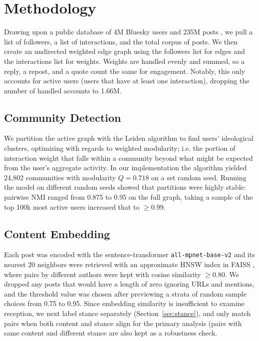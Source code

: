 \documentclass[11pt]{article}   %
\begin{document}
\section{Methodology}\label{sec:methodology}
Drawing upon a public database of 4M Bluesky users and 235M posts \parencite{FaillaRossetti2024, FaillaRossetti2025}, we pull a list of followers, a list of interactions, and the total corpus of posts. We then
create an undirected weighted edge graph using the followers list for edges and the interactions list for weights. Weights are handled evenly and summed, so a reply, a repost, and a quote count the
same for engagement. Notably, this only accounts for active users (users that have at least one interaction), dropping the number of handled accounts to 1.66M.

\subsection{Community Detection}\label{sec:communities}
We partition the active graph with the Leiden algorithm \parencite{Traag2019} to find users' ideological clusters, optimizing with regards to weighted modularity; i.e.
the portion of interaction weight that falls within a community beyond what might be expected from the user's aggregate activity.
In our implementation the algorithm yielded 24,802 communities with modularity $Q = 0.718$ on a set random seed. Running the model on different random seeds
showed that partitions were highly stable: pairwise NMI ranged from 0.875 to 0.95 on the full graph, taking a
sample of the top 100k most active users increased that to $\geq 0.99$.

\subsection{Content Embedding}\label{sec:embedding}
Each post was encoded with the sentence-transformer \texttt{all-mpnet-base-v2} \parencite{Reimers2019} and its nearest 20
neighbors were retrieved with an approximate HNSW index \parencite{Malkov2020} in FAISS
\parencite{Johnson2021}, where pairs by different authors were kept with cosine similarity $\geq 0.80$. We dropped any posts that would have a length of zero ignoring URLs
and mentions, and the threshold value was chosen after previewing a strata of random sample choices from 0.75 to 0.95. Since embedding similarity is insufficient to examine reception,
we next label stance separately (Section~\ref{sec:stance}), and only match pairs when both content and stance align for the primary analysis (pairs with same content and different stance are also kept as a robustness check.
\end{document}
